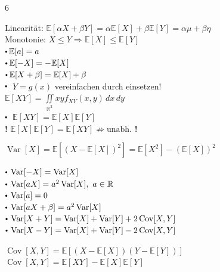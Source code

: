 \documentclass[8pt,a4paper,landscape]{extarticle}
\begin{document}
\begin{multicols*}{6}
\CheatsheetItemListStart
\CheatsheetItemListEnd
\par\vspace{2pt}
Linearität: $\mathbb{E}[\alpha X + \beta Y] = \alpha \mathbb{E}[X] + \beta \mathbb{E}[Y] = \alpha\mu + \beta\eta$ \\
Monotonie: $X \le Y \Rightarrow \mathbb{E}[X] \le \mathbb{E}[Y]$ \\
$\sbullet \mathbb{E}[a] = a$ \\
$\sbullet \mathbb{E}[-X] = -\mathbb{E}[X]$ \\
$\sbullet \mathbb{E}[X + \beta] = \mathbb{E}[X] + \beta$ \\
$\sbullet$  $Y = g(x)$ vereinfachen durch einsetzen! \\
\hspace*{4pt} $ \mathbb{E}[X Y] = \iint\limits_{\mathbb{R}^2} x y f_{XY}(x,y) \, dx \, dy$ \\

$\sbullet$  \quad
$\mathbb{E}[X Y] = \mathbb{E}[X]\mathbb{E}[Y]$ \\
{\color{red}\textbf{!} $\mathbb{E}[X]\mathbb{E}[Y] = \mathbb{E}[XY] \nRightarrow \text{unabh.}$ \textbf{!}}

$\operatorname{Var}[X] = \mathbb{E}[(X-\mathbb{E}[X])^2] = \mathbb{E}[X^2] - (\mathbb{E}[X])^2$

\CheatsheetItemListStart
\CheatsheetItemListEnd
$\sbullet \operatorname{Var}[-X] = \operatorname{Var}[X]$ \\
$\sbullet \operatorname{Var}[aX] = a^2\operatorname{Var}[X],\ a \in \mathbb{R}$ \\
$\sbullet \operatorname{Var}[a] = 0$ \\
$\sbullet \operatorname{Var}[aX+\beta] = a^2\operatorname{Var}[X]$ \\
$\sbullet \operatorname{Var}[X+Y] = \operatorname{Var}[X] + \operatorname{Var}[Y] + 2\operatorname{Cov}[X,Y]$ \\
$\sbullet \operatorname{Var}[X-Y] = \operatorname{Var}[X] + \operatorname{Var}[Y] - 2\operatorname{Cov}[X,Y]$


$\operatorname{Cov}[X,Y] = \mathbb{E}[(X-\mathbb{E}[X])(Y-\mathbb{E}[Y])]$ \\
$\operatorname{Cov}[X,Y] = \mathbb{E}[XY]-\mathbb{E}[X]\mathbb{E}[Y]$


\end{multicols*}
\end{document}
